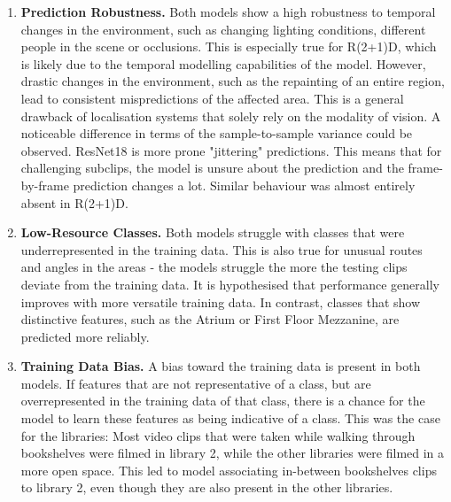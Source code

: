 \documentclass[a4paper]{article}
\begin{document}
  \begin{enumerate} 

    \item \textbf{Prediction Robustness.} Both models show a high robustness to
      temporal changes in the environment, such as changing lighting conditions,
      different people in the scene or occlusions. This is especially true for
      R(2+1)D, which is likely due to the temporal modelling capabilities of the
      model. However, drastic changes in the environment, such as the repainting
      of an entire region, lead to consistent mispredictions of the affected
      area. This is a general drawback of localisation systems that solely rely
      on the modality of vision. A noticeable difference in terms of the
      sample-to-sample variance could be observed. ResNet18 is more prone
      "jittering" predictions. This means that for challenging subclips, the
      model is unsure about the prediction and the frame-by-frame prediction
      changes a lot. Similar behaviour was almost entirely absent in R(2+1)D.

    \item \textbf{Low-Resource Classes.} Both models struggle with classes that
      were underrepresented in the training data. This is also true for unusual
      routes and angles in the areas - the models struggle the more the testing
      clips deviate from the training data. It is hypothesised that performance
      generally improves with more versatile training data. In contrast, classes
      that show distinctive features, such as the Atrium or First Floor
      Mezzanine, are predicted more reliably.

    \item \textbf{Training Data Bias.} A bias toward the training data is
      present in both models. If features that are not representative of a
      class, but are overrepresented in the training data of that class, there
      is a chance for the model to learn these features as being indicative of a
      class. This was the case for the libraries: Most video clips that were
      taken while walking through bookshelves were filmed in library 2, while
      the other libraries were filmed in a more open space. This led to model
      associating in-between bookshelves clips to library 2, even though they
      are also present in the other libraries.

  \end{enumerate}

\end{document}
